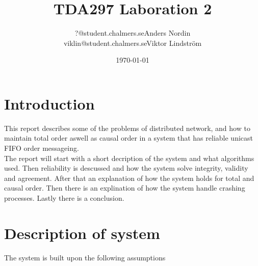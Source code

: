 \documentclass{article}
\title{TDA297 Laboration 2}
\author{?@student.chalmers.se\quad Anders Nordin\\
        viklin@student.chalmers.se\quad Viktor Lindstr\"{o}m}
\date{\today}
\begin{document}
\maketitle
\newpage
\section{Introduction}
  This report describes some of the problems of distributed network, and how to maintain
  total order aswell as causal order in a system that has reliable unicast FIFO order messageing.\\
  The report will start with a short decription of the system and what algorithms 
  used. Then reliability is descussed and how the system solve integrity, validity and
  agreement. After that an explanation of how the system holds for total and causal order.
  Then there is an explination of how the system handle crashing processes. Lastly there
  is a conclusion.

\section{Description of system}
  The system is built upon the following assumptions
\end{document}
